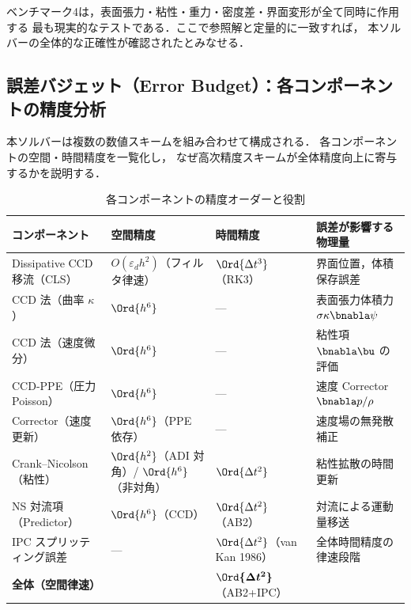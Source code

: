 ベンチマーク4は，表面張力・粘性・重力・密度差・界面変形が全て同時に作用する
最も現実的なテストである．ここで参照解と定量的に一致すれば，
本ソルバーの全体的な正確性が確認されたとみなせる．

\subsection{誤差バジェット（Error Budget）：各コンポーネントの精度分析}
\label{sec:error_budget}

本ソルバーは複数の数値スキームを組み合わせて構成される．
各コンポーネントの空間・時間精度を一覧化し，
なぜ高次精度スキームが全体精度向上に寄与するかを説明する．

\begin{table}[htbp]
\centering
\caption{各コンポーネントの精度オーダーと役割}
\label{tab:error_budget}
\renewcommand{\arraystretch}{1.35}
\begin{tabular}{>{\raggedright\arraybackslash}p{32mm}>{\raggedright\arraybackslash}p{28mm}>{\raggedright\arraybackslash}p{28mm}>{\raggedright\arraybackslash}p{48mm}}
\toprule
コンポーネント & 空間精度 & 時間精度 & 誤差が影響する物理量 \\
\midrule
Dissipative CCD 移流（CLS） & $O(\varepsilon_d h^2)$（フィルタ律速） & $\Ord{\Delta t^3}$（RK3） & 界面位置，体積保存誤差 \\
CCD 法（曲率 $\kappa$） & $\Ord{h^6}$ & — & 表面張力体積力 $\sigma\kappa\bnabla\psi$ \\
CCD 法（速度微分） & $\Ord{h^6}$ & — & 粘性項 $\bnabla\bu$ の評価 \\
CCD-PPE（圧力 Poisson） & $\Ord{h^6}$ & — & 速度 Corrector $\bnabla p/\rho$ \\
Corrector（速度更新） & $\Ord{h^6}$（PPE 依存） & — & 速度場の無発散補正 \\
Crank--Nicolson（粘性） & $\Ord{h^2}$（ADI 対角）/ $\Ord{h^6}$（非対角） & $\Ord{\Delta t^2}$ & 粘性拡散の時間更新 \\
NS 対流項（Predictor） & $\Ord{h^6}$（CCD） & $\Ord{\Delta t^2}$（AB2） & 対流による運動量移送 \\
IPC スプリッティング誤差 & — & $\Ord{\Delta t^2}$（van Kan 1986） & 全体時間精度の律速段階 \\
\midrule
\textbf{全体（空間律速）} & \multicolumn{1}{>{\raggedright\arraybackslash}p{28mm}}{$\boldsymbol{\Ord{h^2}}$（CSF $O(\varepsilon^2)$）} & $\boldsymbol{\Ord{\Delta t^2}}$（AB2+IPC） & \\
\bottomrule
\end{tabular}
\end{table}


